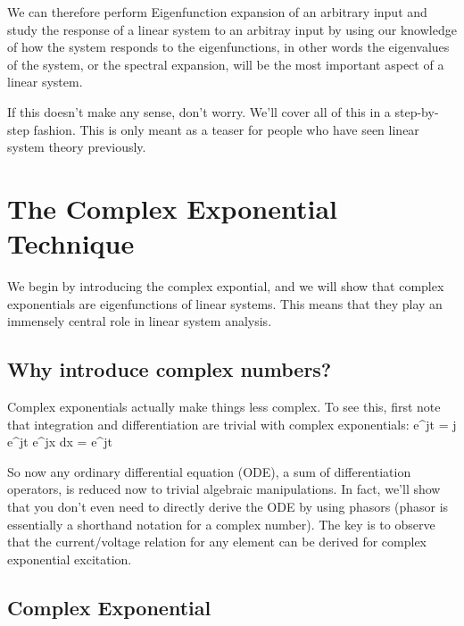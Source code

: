 We can therefore perform Eigenfunction expansion of an arbitrary input and study the response of a linear system to an arbitray input by using our knowledge of how the system responds to the eigenfunctions, in other words the eigenvalues of the system, or the spectral expansion, will be the most important aspect of a linear system.

If this doesn't make any sense, don't worry.  We'll cover all of this in a step-by-step fashion. This is only meant as a teaser for people who have seen linear system theory previously. 


\section{The Complex Exponential Technique}

We begin by introducing the complex expontial, and we will show that complex exponentials are eigenfunctions of linear systems.  This means that they play an immensely central role in linear system analysis.




\subsection{Why introduce complex numbers?}


Complex exponentials actually make things less complex.  To see this, first note that integration and differentiation are trivial with complex exponentials:
\be {} e^{j\omega t} = j \omega e^{j\omega t} \ee
\be \int e^{j\omega x} dx =  e^{j\omega t} \ee

So now any ordinary differential equation (ODE), a sum of differentiation operators, is reduced now to trivial algebraic manipulations.  In fact, we'll show that you don't even need to directly derive the ODE by using phasors (phasor is essentially a shorthand notation for a complex number).   The key is to observe that the current/voltage relation for any element can be derived for complex exponential excitation.




\subsection{Complex Exponential}


